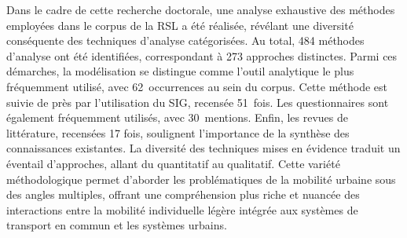 \begin{refsegment}
Dans le cadre de cette recherche doctorale, une analyse exhaustive des méthodes employées dans le corpus de la \acrshort{RSL} a été réalisée, révélant une diversité conséquente des techniques d'analyse catégorisées. Au total, 484 méthodes d'analyse ont été identifiées, correspondant à 273 approches distinctes. Parmi ces démarches, la modélisation se distingue comme l'outil analytique le plus fréquemment utilisé, avec 62~occurrences au sein du corpus. Cette méthode est suivie de près par l'utilisation du \acrfull{SIG}, recensée 51~fois. Les questionnaires sont également fréquemment utilisés, avec 30~mentions. Enfin, les revues de littérature, recensées 17 fois, soulignent l'importance de la synthèse des connaissances existantes. La diversité des techniques mises en évidence traduit un éventail d'approches, allant du quantitatif au qualitatif. Cette variété méthodologique permet d'aborder les problématiques de la mobilité urbaine sous des angles multiples, offrant une compréhension plus riche et nuancée des interactions entre la mobilité individuelle légère intégrée aux systèmes de transport en commun et les systèmes urbains.%


\end{refsegment}

